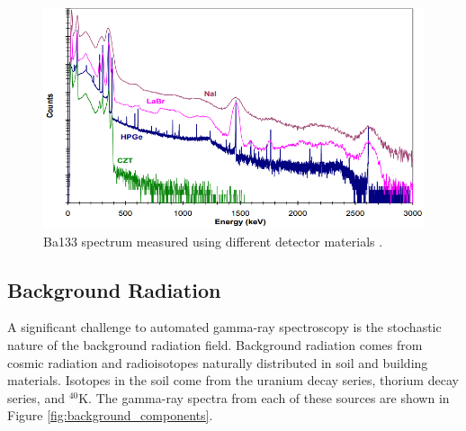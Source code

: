 \begin{figure}[H]
\centering
\includegraphics[width=0.8\linewidth]{images/Ba133_spectrum_different_detector_materials_Market_Survey_Report}
\caption{Ba133 spectrum measured using different detector materials \cite{RIIDMarketSurveyReport}.}
\label{fig:Ba133_spectrum_different_detector_materials_Market_Survey_Report}
\end{figure}


\subsection{Background Radiation}



A significant challenge to automated gamma-ray spectroscopy is the stochastic nature of the background radiation field. Background radiation comes from cosmic radiation and radioisotopes naturally distributed in soil and building materials. Isotopes in the soil come from the uranium decay series, thorium  decay series, and $^{40}$K. The gamma-ray spectra from each of these sources are shown in Figure \ref{fig:background_components}. 

